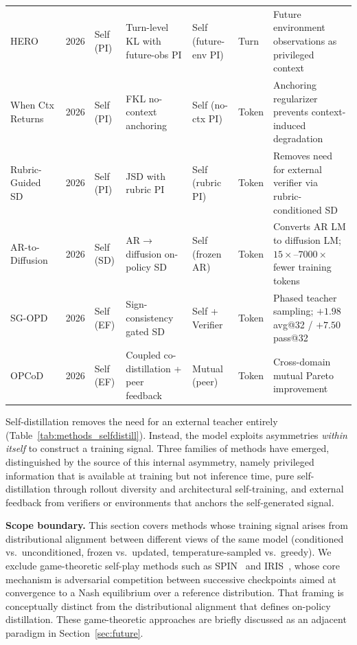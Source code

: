 \documentclass{article} %
\begin{document}
\begin{table}[t]
{\begin{tabular}{@{}lclllll@{}}
        HERO~\citep{2606.11559} & 2026 & Self (PI) & Turn-level KL with future-obs PI & Self (future-env PI) & Turn & Future environment observations as privileged context \\
        When Ctx Returns~\citep{2606.11627} & 2026 & Self (PI) & FKL no-context anchoring & Self (no-ctx PI) & Token & Anchoring regularizer prevents context-induced degradation \\
        Rubric-Guided SD~\citep{2606.12507} & 2026 & Self (PI) & JSD with rubric PI & Self (rubric PI) & Token & Removes need for external verifier via rubric-conditioned SD \\
        AR-to-Diffusion~\citep{2606.06712} & 2026 & Self (SD) & AR$\to$diffusion on-policy SD & Self (frozen AR) & Token & Converts AR LM to diffusion LM; $15\times$--$7000\times$ fewer training tokens \\
        SG-OPD~\citep{2606.09304} & 2026 & Self (EF) & Sign-consistency gated SD & Self + Verifier & Token & Phased teacher sampling; $+1.98$ avg@32 / $+7.50$ pass@32 \\
        OPCoD~\citep{2606.14368} & 2026 & Self (EF) & Coupled co-distillation + peer feedback & Mutual (peer) & Token & Cross-domain mutual Pareto improvement \\
        \bottomrule
    \end{tabular}
    }
\end{table}

Self-distillation removes the need for an external teacher entirely (Table~\ref{tab:methods_selfdistill}). Instead, the model exploits asymmetries \emph{within itself} to construct a training signal. Three families of methods have emerged, distinguished by the source of this internal asymmetry, namely privileged information that is available at training but not inference time, pure self-distillation through rollout diversity and architectural self-training, and external feedback from verifiers or environments that anchors the self-generated signal.

\textbf{Scope boundary.} This section covers methods whose training signal arises from distributional alignment between different views of the same model (conditioned vs.\ unconditioned, frozen vs.\ updated, temperature-sampled vs.\ greedy). We exclude game-theoretic self-play methods such as SPIN~\citep{2401.01335} and IRIS~\citep{2604.20933}, whose core mechanism is adversarial competition between successive checkpoints aimed at convergence to a Nash equilibrium over a reference distribution. That framing is conceptually distinct from the distributional alignment that defines on-policy distillation. These game-theoretic approaches are briefly discussed as an adjacent paradigm in Section~\ref{sec:future}.
\end{document}
